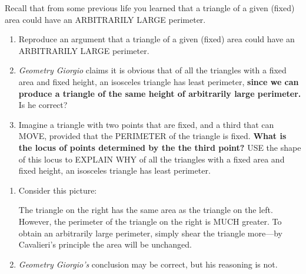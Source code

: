 \documentclass[nooutcomes,noauthor,hints,handout]{ximera}
\begin{document}
\begin{question}
  Recall that from some previous life you learned that a triangle of a
  given (fixed) area could have an ARBITRARILY LARGE perimeter.
  \begin{enumerate}
  \item Reproduce an argument that a triangle of a given (fixed) area
    could have an ARBITRARILY LARGE perimeter.
  \item \textit{Geometry Giorgio} claims it is obvious that of all the
    triangles with a fixed area and fixed height, an isosceles triangle
    has least perimeter, \textbf{since we can produce a triangle of the same height
      of arbitrarily large perimeter.} Is he correct?
  \item Imagine a triangle with two points that are fixed, and a third
    that can MOVE, provided that the PERIMETER of the triangle is
    fixed. \textbf{What is the locus of points determined by the the third
    point?} USE the shape of this locus to EXPLAIN WHY of all the
    triangles with a fixed area and fixed height, an isosceles triangle
    has least perimeter.
  \end{enumerate}
  \begin{freeResponse}
    \begin{enumerate}
    \item Consider this picture:
      \begin{center}
      \end{center}
      The triangle on the right has the same area as the triangle on
      the left. However, the perimeter of the triangle on the right is
      MUCH greater.  To obtain an arbitrarily large perimeter, simply
      shear the triangle more---by Cavalieri's principle the area will
      be unchanged.
    \item \textit{Geometry Giorgio's} conclusion may be correct, but his
      reasoning is not. 
      \begin{center}
\end{center}
\end{enumerate}
\end{freeResponse}
\end{question}
\end{document}
